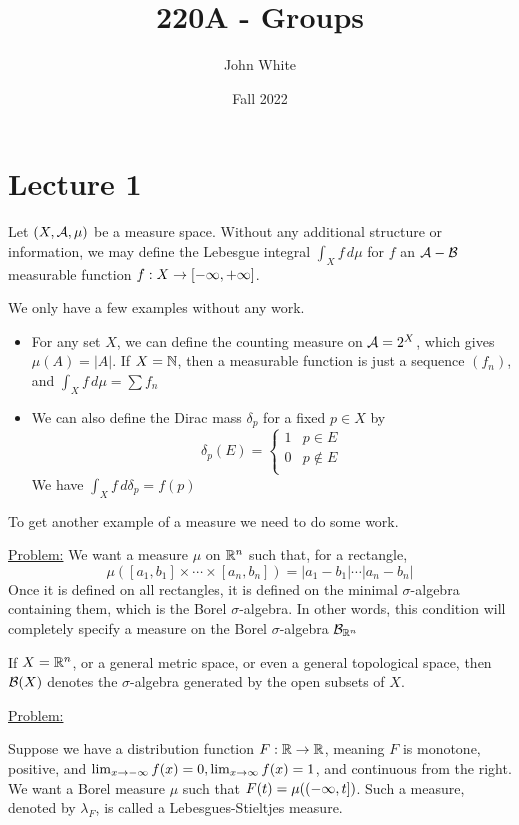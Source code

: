 \documentclass[x11names,reqno,14pt]{extarticle}
\title{220A - Groups}
\author{John White}
\date{Fall 2022}
\begin{document}
\section*{Lecture 1}

Let $(X, \mathcal{A}, \mu)$ be a measure space. Without any additional structure or information, we may define the Lebesgue integral $\int_Xf\,d\mu$ for $f$ an $\mathcal{A}-\mathcal{B}$ measurable function $f:X\to[-\infty,+\infty]$. 

We only have a few examples without any work. 

\exm

\begin{itemize}

\item For any set $X$, we can define the counting measure on $\mathcal{A} = 2^X$, which gives $\mu(A) = |A|$. If $X = \mathbb{N}$, then a measurable function is just a sequence $(f_n)$, and $\int_Xf\,d\mu = \sum f_n$

\item We can also define the Dirac mass $\delta_p$ for a fixed $p \in X$ by 
\[
\delta_p(E) = \begin{cases} 1 & p \in E \\ 0 & p \not\in E\\ \end{cases}
\]
We have $\int_Xf\,d\delta_p = f(p)$

\end{itemize}

To get another example of a measure we need to do some work. 

\underline{Problem:} We want a measure $\mu$ on $\mathbb{R}^n$ such that, for a rectangle, 
\[
\mu([a_1,b_1]\times\cdots\times[a_n, b_n]) = |a_1 - b_1|\cdots|a_n - b_n|
\]
Once it is defined on all rectangles, it is defined on the minimal $\sigma$-algebra containing them, which is the Borel $\sigma$-algebra. In other words, this condition will completely specify a measure on the Borel $\sigma$-algebra $\mathcal{B}_{\mathbb{R}^n}$

If $X = \mathbb{R}^n$, or a general metric space, or even a general topological space, then $\mathcal{B}(X)$ denotes the $\sigma$-algebra generated by the open subsets of $X$. 

\underline{Problem:} 

Suppose we have a distribution function $F:\mathbb{R}\to\mathbb{R}$, meaning $F$ is monotone, positive, and $\lim_{x\to-\infty}f(x) = 0, \lim_{x\to\infty}f(x) = 1$, and continuous from the right. We want a Borel measure $\mu$ such that $F(t) = \mu((-\infty, t])$. Such a measure, denoted by $\lambda_F$, is called a Lebesgues-Stieltjes measure. 
\end{document}
